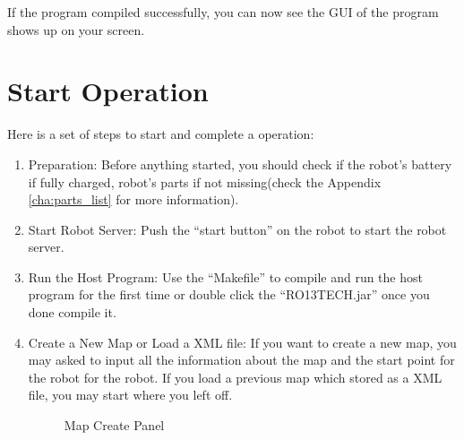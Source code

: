 \documentclass[11pt, a4paper]{report}
\begin{document}
If the program compiled successfully, you can now see the GUI of the program shows up on your screen.\\
\pagebreak




\section{Start Operation} %
\label{sec:start_operation}
Here is a set of steps to start and complete a operation:

\begin{enumerate}
	\item {Preparation: }Before anything started, you should check if the robot's battery if fully charged, robot's parts if not missing(check the Appendix \ref{cha:parts_list} for more information). 
	\item {Start Robot Server: }Push the ``start button'' on the robot to start the robot server.
	\item {Run the Host Program: }Use the ``Makefile'' to compile and run the host program for the first time or double click the ``RO13TECH.jar'' once you done compile it.
	\item {Create a New Map or Load a XML file: }If you want to create a new map, you may asked to input all the information about the map and the start point for the robot for the robot. If you load a previous map which stored as a XML file, you may start where you left off.
														\begin{figure}[ht]
														\centering
														\setlength\fboxsep{2pt}
														\setlength\fboxrule{0.2pt}
														\caption{Map Create Panel}
														\label{sec:mcp}
														\label{fig:mcp}
														\end{figure}


\end{enumerate}
\end{document}
